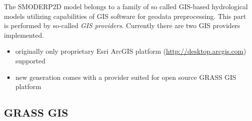 

\justifying
{\rmfamily The SMODERP2D model belongs to a family of so called
GIS-based hydrological models utilizing capabilities of GIS software
for geodata preprocessing. This part is performed by so-called {\em
GIS providers}. Currently there are two GIS providers implemented.

\begin{itemize}
\item originally only proprietary Esri ArcGIS platform (\url{http://desktop.arcgis.com}) supported
\item new generation comes with a provider suited for open source GRASS GIS platform 
\end{itemize}
}

\subsection{GRASS GIS}

